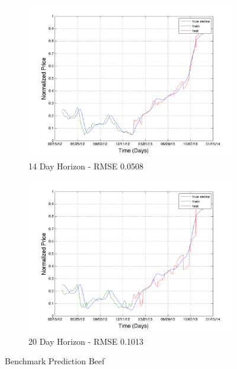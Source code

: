 \begin{figure}
       \hfill
       
        \begin{subfigure}[b]{0.5\textwidth}
                \includegraphics[width=\textwidth]{img/model/beef/pred_14}
                \caption{14 Day Horizon - RMSE 0.0508}
                \label{fig:mouse}
        \end{subfigure}%
         \begin{subfigure}[b]{0.5\textwidth}
                \includegraphics[width=\textwidth]{img/model/beef/pred_20}
                \caption{20 Day Horizon - RMSE 0.1013}
                \label{fig:mouse}
        \end{subfigure}
        \caption{Benchmark Prediction Beef}
        \label{fig:beef_1}
\end{figure}




